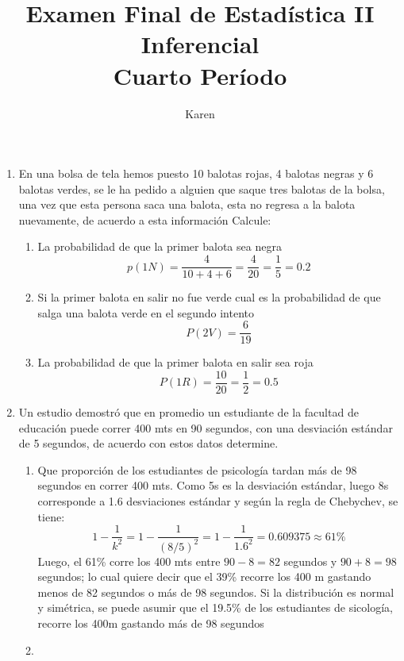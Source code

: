 \documentclass[10pt,a4paper]{article}
\author{Karen}
\title{Examen Final de Estadística II Inferencial\\
Cuarto Período}
\begin{document}
\maketitle
\begin{enumerate}
\item En una bolsa de tela hemos puesto 10 balotas rojas, 4 balotas negras y 6 balotas verdes, se le ha pedido a alguien que saque tres balotas de la bolsa, una vez que esta persona saca una balota, esta no regresa a la balota nuevamente, de acuerdo a esta información Calcule:
\begin{enumerate}
\item La probabilidad de que la primer balota sea negra
\[p(1N)=\dfrac{4}{10+4+6}=\dfrac{4}{20}=\dfrac{1}{5}=0.2\]
\item Si la primer balota en salir no fue verde cual es la probabilidad de que salga una balota verde en el segundo intento
\[P(2V)=\dfrac{6}{19}\]
\item La probabilidad de que la primer balota en salir sea roja
\[P(1R)=\dfrac{10}{20}=\dfrac{1}{2}=0.5\]
\end{enumerate}
\item Un estudio demostró que en promedio un estudiante de la facultad de educación puede correr 400 mts en 90 segundos, con una desviación estándar de 5 segundos, de acuerdo con estos datos determine.
\begin{enumerate}
\item Que proporción de los estudiantes de psicología tardan más de 98 segundos en correr 400 mts. Como 5s es la desviación estándar, luego 8s corresponde a 1.6 desviaciones estándar y según la regla de Chebychev, se tiene:
\[1-\dfrac{1}{k^{2}}=1-\dfrac{1}{(8/5)^{2}}=1-\dfrac{1}{1.6^{2}}=0.609375\approx 61\%\]
Luego, el 61\% corre los 400 mts entre $90-8=82$ segundos y $90+8=98$ segundos; lo cual quiere decir que el 39\% recorre los 400 m gastando menos de 82 segundos o más de 98 segundos. Si la distribución es normal y simétrica, se puede asumir que el 19.5\% de los estudiantes de sicología, recorre los 400m gastando más de 98 segundos
\item
\end{enumerate}
\end{enumerate}
\end{document}
